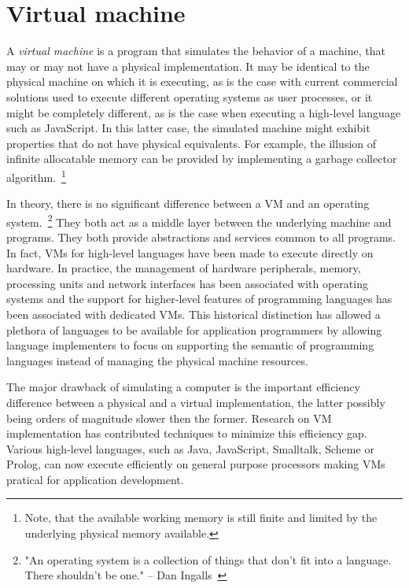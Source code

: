 \section{Virtual machine}

A \textit{virtual machine} is a program that simulates the behavior of a
machine, that may or may not have a physical implementation. It may be
identical to the physical machine on which it is executing, as is the case with
current commercial solutions used to execute different operating systems as user
processes, or it might be completely different, as is the case when executing a
high-level language such as JavaScript. In this latter case, the simulated
machine might exhibit properties that do not have physical equivalents.
For example, the illusion of infinite allocatable memory can be provided by
implementing a garbage collector algorithm.~\footnote{Note, that the available
working memory is still finite and limited by the underlying physical memory
available.} 

In theory, there is no significant difference between a VM and
an operating system.~\footnote{"An operating system is a collection of
things that don't fit into a language. There shouldn't be one." -- Dan
Ingalls~\cite{Ingalls1981}} They both act as a middle layer between the
underlying machine and programs. They both provide abstractions and
services common to all programs. In fact, VMs for high-level
languages have been made to execute directly on hardware. In practice, the
management of hardware peripherals, memory, processing units and network
interfaces has been associated with operating systems and the support for
higher-level features of programming languages has been associated with
dedicated VMs. This historical distinction has allowed a plethora
of languages to be available for application programmers by allowing language
implementers to focus on supporting the semantic of programming languages
instead of managing the physical machine resources.

The major drawback of simulating a computer is the important efficiency
difference between a physical and a virtual implementation, the latter possibly
being orders of magnitude slower then the former. Research on VM
implementation has contributed techniques to minimize this efficiency gap.
Various high-level languages, such as Java, JavaScript, Smalltalk, Scheme or
Prolog, can now execute efficiently on general purpose processors making VMs
pratical for application development.

